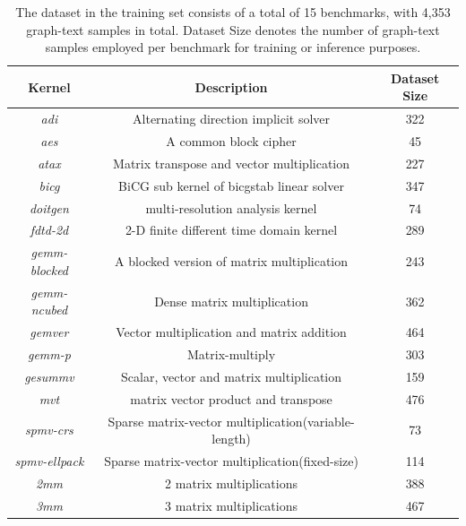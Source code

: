 \documentclass[conference]{IEEEtran}
\begin{document}
		\begin{table}[t]
			\setlength{\tabcolsep}{3pt}
			\centering
			\caption{The dataset in the training set consists of a total of 15 benchmarks, with 4,353 graph-text samples in total. Dataset Size denotes the number of graph-text samples employed per benchmark for training or inference purposes.}
			\begin{tabular}{c|c|c}
				\toprule
				\bf{Kernel} & \bf{Description} & \bf{Dataset Size} \\
				\midrule
				\textit{adi} &\scriptsize{Alternating direction implicit solver} & 322\\
				\textit{aes} & \scriptsize{A common block cipher} & 45 \\
				\textit{atax} &\scriptsize{Matrix transpose and vector multiplication} & 227\\
				\textit{bicg} &\scriptsize{BiCG sub kernel of bicgstab linear solver} & 347\\
				\textit{doitgen} &\scriptsize{multi-resolution analysis kernel} & 74\\
				\textit{fdtd-2d} &\scriptsize{2-D finite different time domain kernel} & 289\\
				\textit{gemm-blocked} &	\scriptsize{A blocked version of matrix multiplication} & 243 \\
				\textit{gemm-ncubed} & \scriptsize{Dense matrix multiplication} & 362\\
				\textit{gemver} &\scriptsize{Vector multiplication and matrix addition} & 464\\
				\textit{gemm-p} &\scriptsize{Matrix-multiply} & 303\\
				\textit{gesummv} &\scriptsize{Scalar, vector and matrix multiplication} & 159\\
				\textit{mvt} &\scriptsize{matrix vector product and transpose} & 476\\
				\textit{spmv-crs} & \scriptsize{Sparse matrix-vector multiplication(variable-length)}& 73\\
				\textit{spmv-ellpack} &\scriptsize{Sparse matrix-vector multiplication(fixed-size)} & 114\\
				\textit{2mm} &\scriptsize{2 matrix multiplications}& 388\\
				\textit{3mm} &\scriptsize{3 matrix multiplications} & 467\\ 
				\bottomrule
			\end{tabular}
			\vspace{-4mm}
			\label{ts}
		\end{table}
	
\end{document}
